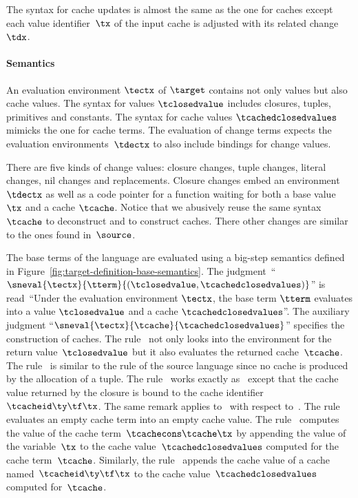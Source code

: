 The syntax for cache updates is almost the same as the one for caches
except each value identifier~$\tx$ of the input cache is adjusted with
its related change~$\tdx$.

\paragraph{Semantics}
An evaluation environment $\tectx$ of $\target$ contains not only
values but also cache values. The syntax for values $\tclosedvalue$
includes closures, tuples, primitives and constants. The syntax for
cache values $\tcachedclosedvalues$ mimicks the one for cache terms.
The evaluation of change terms expects the evaluation
environments~$\tdectx$ to also include bindings for change values.

There are five kinds of change values: closure changes, tuple changes,
literal changes, nil changes and replacements.  Closure changes embed
an environment $\tdectx$ as well as a code pointer for a function
waiting for both a base value $\tx$ and a cache $\tcache$. Notice that
we abusively reuse the same syntax~$\tcache$ to deconstruct and to
construct caches. There other changes are similar to the ones found
in~$\source$.

The base terms of the language are evaluated using a big-step
semantics defined in Figure~\ref{fig:target-definition-base-semantics}.
The judgment~``$\sneval{\tectx}{\tterm}{(\tclosedvalue,
  \tcachedclosedvalues)}$'' is read~``Under the evaluation environment
$\tectx$, the base term $\tterm$ evaluates into a value
$\tclosedvalue$ and a cache $\tcachedclosedvalues$''. The auxiliary
judgment ``$\sneval{\tectx}{\tcache}{\tcachedclosedvalues}$''
specifies the construction of caches.
%
The rule~ not only looks into the environment
for the return value~$\tclosedvalue$ but it also evaluates
the returned cache~$\tcache$.
%
The rule~ is similar to the rule of the source
language since no cache is produced by the allocation of a tuple.
%
The rule~ works exactly
as~ except that the cache value returned by the
closure is bound to the cache identifier $\tcacheid\ty\tf\tx$. The
same remark applies to~ with respect
to~.
%
The rule~ evaluates an empty cache term into an
empty cache value. The rule~ computes the value of
the cache term~$\tcachecons\tcache\tx$ by appending the value of the
variable~$\tx$ to the cache value~$\tcachedclosedvalues$ computed for
the cache term~$\tcache$. Similarly, the
rule~ appends the cache value of a cache
named~$\tcacheid\ty\tf\tx$ to the cache value~$\tcachedclosedvalues$
computed for~$\tcache$.

